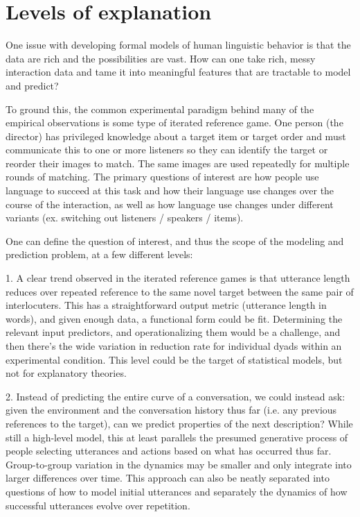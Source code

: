 \documentclass[]{article}
\begin{document}
	
	\section{Levels of explanation}
	One issue with developing formal models of human linguistic behavior is that the data are rich and the possibilities are vast. How can one take rich, messy interaction data and tame it into meaningful features that are tractable to model and predict? 
	
	To ground this, the common experimental paradigm behind many of the empirical observations is some type of iterated reference game. One person (the director) has privileged knowledge about a target item or target order and must communicate this to one or more listeners so they can identify the target or reorder their images to match. The same images are used repeatedly for multiple rounds of matching. The primary questions of interest are how people use language to succeed at this task and how their language use changes over the course of the interaction, as well as how language use changes under different variants (ex. switching out listeners / speakers / items). 
	
	One can define the question of interest, and thus the scope of the modeling and prediction problem, at a few different levels:
	
	
	1. A clear trend observed in the iterated reference games is that utterance length reduces over repeated reference to the same novel target between the same pair of interlocuters. This has a straightforward output metric (utterance length in words), and given enough data, a functional form could be fit.  Determining the relevant input predictors, and operationalizing them would be a challenge, and then there's the wide variation in reduction rate for individual dyads within an experimental condition. This level could be the target of statistical models, but not for explanatory theories. 
	
	2. Instead of predicting the entire curve of a conversation, we could instead ask: given the environment and the conversation history thus far (i.e. any previous references to the target), can we predict properties of the next description? While still a high-level model, this at least parallels the presumed generative process of people selecting utterances and actions based on what has occurred thus far. Group-to-group variation in the dynamics may be smaller and only integrate into larger differences over time. This approach can also be neatly separated into questions of how to model initial utterances and separately the dynamics of how successful utterances evolve over repetition. 
	
\end{document}
